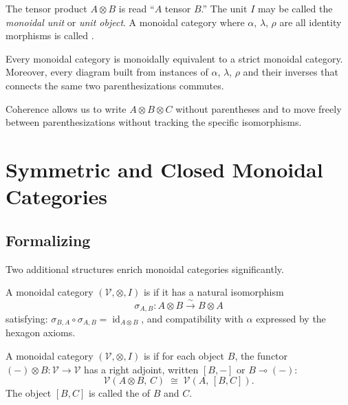 \begin{howtosay}
The tensor product $A \otimes B$ is read ``$A$ tensor $B$.'' The unit $I$ may be
called the \emph{monoidal unit} or \emph{unit object}. A monoidal category where
$\alpha$, $\lambda$, $\rho$ are all identity morphisms is called .
\end{howtosay}

\begin{theorem}
Every monoidal category is monoidally equivalent to a strict monoidal category.
Moreover, every diagram built from instances of $\alpha$, $\lambda$, $\rho$
and their inverses that connects the same two parenthesizations commutes.
\end{theorem}

Coherence allows us to write $A \otimes B \otimes C$ without parentheses and
to move freely between parenthesizations without tracking the specific isomorphisms.

\section{Symmetric and Closed Monoidal Categories}

\subsection{Formalizing}

Two additional structures enrich monoidal categories significantly.

\begin{definition}
A monoidal category $(\mathcal{V}, \otimes, I)$ is  if it has
a natural isomorphism
\[
  \sigma_{A,B} : A \otimes B \xrightarrow{\sim} B \otimes A
\]
satisfying: $\sigma_{B,A} \circ \sigma_{A,B} = \operatorname{id}_{A \otimes B}$,
and compatibility with $\alpha$ expressed by the hexagon axioms.
\end{definition}

\begin{definition}
A monoidal category $(\mathcal{V}, \otimes, I)$ is  if for each
object $B$, the functor $(-) \otimes B : \mathcal{V} \to \mathcal{V}$ has a right
adjoint, written $[B, -]$ or $B \multimap (-)$:
\[
  \mathcal{V}(A \otimes B,\, C) \;\cong\; \mathcal{V}(A,\, [B, C]).
\]
The object $[B, C]$ is called the  of $B$ and $C$.
\end{definition}

